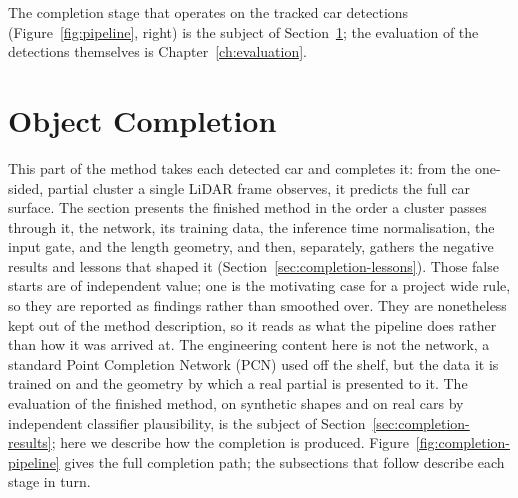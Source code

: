 \documentclass[a4paper,12pt]{report}
\begin{document}
The completion stage that operates on the tracked car detections
(Figure~\ref{fig:pipeline}, right) is the subject of Section~\ref{ch:completion-method}; the evaluation of
the detections themselves is Chapter~\ref{ch:evaluation}.



%
%
%
%
%
\section{Object Completion}
\label{ch:completion-method}

This part of the method takes each detected car and completes it:
from the one-sided, partial cluster a single LiDAR frame observes, it predicts
the full car surface. The section presents the finished method in the order a
cluster passes through it, the network, its training data, the inference time
normalisation, the input gate, and the length geometry, and then, separately,
gathers the negative results and lessons that shaped it
(Section~\ref{sec:completion-lessons}). Those false starts are of independent value; one is the motivating case for a project
wide rule, so they are reported as findings rather than smoothed over. They are
nonetheless kept out of the method description, so it reads as what the pipeline does
rather than how it was arrived at. The engineering
content here is not the network, a standard Point Completion Network (PCN) used off the
shelf, but the data it is trained on and the geometry by which a real partial is
presented to it. The evaluation of the finished method, on synthetic shapes and on real
cars by independent classifier plausibility, is the subject of
Section~\ref{sec:completion-results}; here we describe how the completion is produced.
Figure~\ref{fig:completion-pipeline} gives the full completion path; the subsections
that follow describe each stage in turn.
\end{document}
